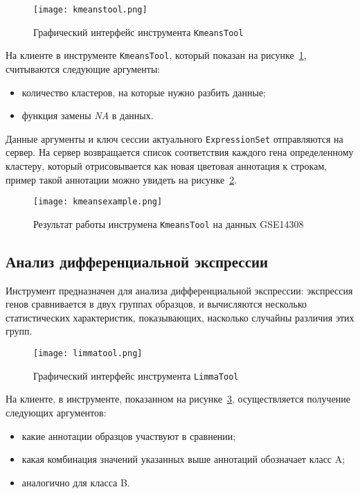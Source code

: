 \begin{figure}[h]
  \caption{Графический интерфейс инструмента \texttt{KmeansTool}}
  \texttt{[image: kmeanstool.png]}
   \label{kmeanstool}
\end{figure}

На клиенте в инструменте \texttt{KmeansTool}, который показан на рисунке~\ref{kmeanstool}, считываются следующие аргументы:
\begin{itemize}
\item количество кластеров, на которые нужно разбить данные;
\item функция замены \emph{NA} в данных.
\end{itemize}

Данные аргументы и ключ сессии актуального \texttt{ExpressionSet} отправляются на сервер. На сервер возвращается список соответствия каждого гена определенному кластеру, который отрисовывается как новая цветовая аннотация к строкам, пример такой аннотации можно увидеть на рисунке~\ref{kmeansexample}.
\begin{figure}[h]
  \caption{Результат работы инструмена \texttt{KmeansTool} на данных GSE14308}
  \texttt{[image: kmeansexample.png]}
  \label{kmeansexample}
\end{figure}

\subsection{Анализ дифференциальной экспрессии}
Инструмент предназначен для анализа дифференциальной экспрессии: экспрессия генов сравнивается в двух группах образцов, и вычисляются несколько статистических характеристик, показывающих, насколько случайны различия этих групп.

\begin{figure}[h]
  \caption{Графический интерфейс инструмента \texttt{LimmaTool}}
  \texttt{[image: limmatool.png]}
  \label{limmatool}
\end{figure}

На клиенте, в инструменте, показанном на рисунке~\ref{limmatool}, осуществляется получение следующих аргументов:
\begin{itemize}
\item какие аннотации образцов участвуют в сравнении;
\item какая комбинация значений указанных выше аннотаций обозначает класс A;
\item аналогично для класса B.
\end{itemize}

